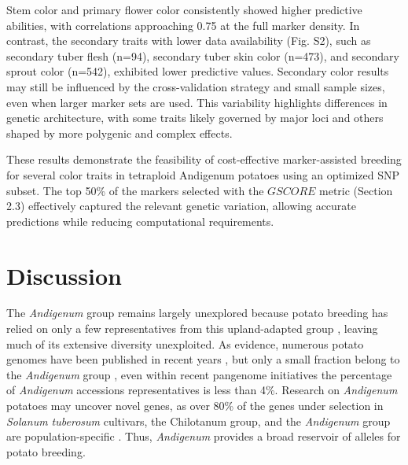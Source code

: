 \documentclass[pdflatex,sn-mathphys-ay]{sn-jnl}%
\begin{document}
Stem color and primary flower color consistently showed higher predictive abilities, with correlations approaching 0.75 at the full marker density. In contrast, the secondary traits with lower data availability (Fig. S2), such as secondary tuber flesh (n=94), secondary tuber skin color (n=473), and secondary sprout color (n=542), exhibited lower predictive values. Secondary color results may still be influenced by the cross-validation strategy and small sample sizes, even when larger marker sets are used. This variability highlights differences in genetic architecture, with some traits likely governed by major loci and others shaped by more polygenic and complex effects.


These results demonstrate the feasibility of cost-effective marker-assisted breeding for several color traits in tetraploid Andigenum potatoes using an optimized SNP subset. The top 50\% of the markers selected with the $GSCORE$ metric (Section 2.3) effectively captured the relevant genetic variation, allowing accurate predictions while reducing computational requirements.







\section{Discussion}


The \textit{Andigenum} group remains largely unexplored \citep{ghislain2020genes} because potato breeding has relied on only a few representatives from this upland-adapted group \citep{spanoghe2022genetic}, leaving much of its extensive diversity unexploited. As evidence, numerous potato genomes have been published in recent years \citep{zhou2020haplotype, campoy2020gamete, sun2022chromosome,  bao2022genome}, but only a small fraction belong to the \textit{Andigenum} group \citep{kanehisa2016blastkoala, diacolg3}, even within recent pangenome initiatives \citep{hoopes2022phased,guo2023pangenome,Bozan2023} the percentage of \textit{Andigenum} accessions representatives is less than 4\%. Research on \textit{Andigenum} potatoes may uncover novel genes, as over 80\% of the genes under selection in \textit{Solanum tuberosum} cultivars, the Chilotanum group, and the \textit{Andigenum} group are population-specific \citep{hardigan2017genome}. Thus, \textit{Andigenum} provides a broad reservoir of alleles for potato breeding. 


\end{document}
